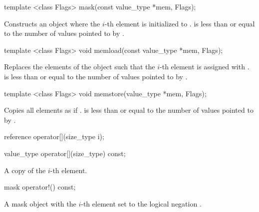 \begin{itemdecl}
template <class Flags> mask(const value_type *mem, Flags);
\end{itemdecl}
\begin{itemdescr}
  \pnum\effects Constructs an object where the $i$-th element is initialized to  \foralli.
  \pnum\requires {} is less than or equal to the number of values pointed to by .
  \flagsRemarks{\mask{}}
\end{itemdescr}

\begin{itemdecl}
template <class Flags> void memload(const value_type *mem, Flags);
\end{itemdecl}
\begin{itemdescr}
  \pnum\effects Replaces the elements of the \mask object such that the $i$-th element is assigned with  \foralli.
  \pnum\requires {} is less than or equal to the number of values pointed to by .
  \flagsRemarks{\mask{}}
\end{itemdescr}

\begin{itemdecl}
template <class Flags> void memstore(value_type *mem, Flags);
\end{itemdecl}
\begin{itemdescr}
  \pnum\effects Copies all \mask elements as if  \foralli.
  \pnum\requires {} is less than or equal to the number of values pointed to by .
  \flagsRemarks{\mask{}}
\end{itemdescr}

\begin{itemdecl}
reference operator[](size_type i);
\end{itemdecl}
\begin{itemdescr}
  \dataparElementReference{\mask}
\end{itemdescr}

\begin{itemdecl}
value_type operator[](size_type) const;
\end{itemdecl}
\begin{itemdescr}
  \pnum\returns A copy of the $i$-th element.
\end{itemdescr}

\begin{itemdecl}
mask operator!() const;
\end{itemdecl}
\begin{itemdescr}
  \pnum\returns A mask object with the $i$-th element set to the logical negation \foralli.
\end{itemdescr}

